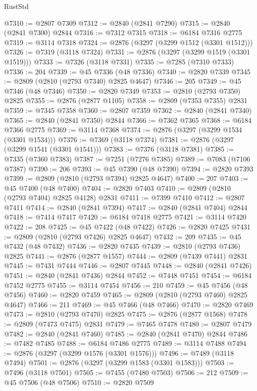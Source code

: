 \begin{lexlean}{RustStd}
\begin{coremodule}
{\begin{coremodule}
{{{{{{{{{{{{{{{{{{{{{{{{{{{{{{{{{@7310 := @2807 @7309
@7312 := @2840 (@2841 @7290)
@7315 := @2840 (@2841 @7300) @2844
@7316 := @7312 @7315
@7318 := @6184 @7316 @2775
@7319 := @3114 @7318
@7324 := @2876 (@3297 (@3299 @1512 (@3301 @1512)))
@7326 := @7319 (@3118 @7324)
@7331 := @2876 (@3297 (@3299 @1519 (@3301 @1519)))
@7333 := @7326 (@3118 @7331)
@7335 := @7285 (@7310 @7333)
@7336 := 204
@7339 := @45 @7336 (@48 @7336)
@7340 := @2820 @7339
@7345 := @2809 (@2810 (@2793 @7340) @2825 @4647)
@7346 := 205
@7349 := @45 @7346 (@48 @7346)
@7350 := @2820 @7349
@7353 := @2810 (@2793 @7350) @2825
@7355 := @2876 (@2877 @1105)
@7358 := @2809 (@7353 @7355) @2831
@7359 := @7345 @7358
@7360 := @2807 @7359
@7362 := @2840 (@2841 @7340)
@7365 := @2840 (@2841 @7350) @2844
@7366 := @7362 @7365
@7368 := @6184 @7366 @2775
@7369 := @3114 @7368
@7374 := @2876 (@3297 (@3299 @1534 (@3301 @1534)))
@7376 := @7369 (@3118 @7374)
@7381 := @2876 (@3297 (@3299 @1541 (@3301 @1541)))
@7383 := @7376 (@3118 @7381)
@7385 := @7335 (@7360 @7383)
@7387 := @7251 (@7276 @7385)
@7389 := @7083 (@7106 @7387)
@7390 := 206
@7393 := @45 @7390 (@48 @7390)
@7394 := @2820 @7393
@7399 := @2809 (@2810 (@2793 @7394) @2825 @4647)
@7400 := 207
@7403 := @45 @7400 (@48 @7400)
@7404 := @2820 @7403
@7410 := @2809 (@2810 (@2793 @7404) @2825 @4128) @2831
@7411 := @7399 @7410
@7412 := @2807 @7411
@7414 := @2840 (@2841 @7394)
@7417 := @2840 (@2841 @7404) @2844
@7418 := @7414 @7417
@7420 := @6184 @7418 @2775
@7421 := @3114 @7420
@7422 := 208
@7425 := @45 @7422 (@48 @7422)
@7426 := @2820 @7425
@7431 := @2809 (@2810 (@2793 @7426) @2825 @4647)
@7432 := 209
@7435 := @45 @7432 (@48 @7432)
@7436 := @2820 @7435
@7439 := @2810 (@2793 @7436) @2825
@7441 := @2876 (@2877 @1557)
@7444 := @2809 (@7439 @7441) @2831
@7445 := @7431 @7444
@7446 := @2807 @7445
@7448 := @2840 (@2841 @7426)
@7451 := @2840 (@2841 @7436) @2844
@7452 := @7448 @7451
@7454 := @6184 @7452 @2775
@7455 := @3114 @7454
@7456 := 210
@7459 := @45 @7456 (@48 @7456)
@7460 := @2820 @7459
@7465 := @2809 (@2810 (@2793 @7460) @2825 @4647)
@7466 := 211
@7469 := @45 @7466 (@48 @7466)
@7470 := @2820 @7469
@7473 := @2810 (@2793 @7470) @2825
@7475 := @2876 (@2877 @1568)
@7478 := @2809 (@7473 @7475) @2831
@7479 := @7465 @7478
@7480 := @2807 @7479
@7482 := @2840 (@2841 @7460)
@7485 := @2840 (@2841 @7470) @2844
@7486 := @7482 @7485
@7488 := @6184 @7486 @2775
@7489 := @3114 @7488
@7494 := @2876 (@3297 (@3299 @1576 (@3301 @1576)))
@7496 := @7489 (@3118 @7494)
@7501 := @2876 (@3297 (@3299 @1583 (@3301 @1583)))
@7503 := @7496 (@3118 @7501)
@7505 := @7455 (@7480 @7503)
@7506 := 212
@7509 := @45 @7506 (@48 @7506)
@7510 := @2820 @7509
}}}}}}}}}}}}}}}}}}}}}}}}}}}}}}}}}
\end{coremodule}}
\end{coremodule}
\end{lexlean}
